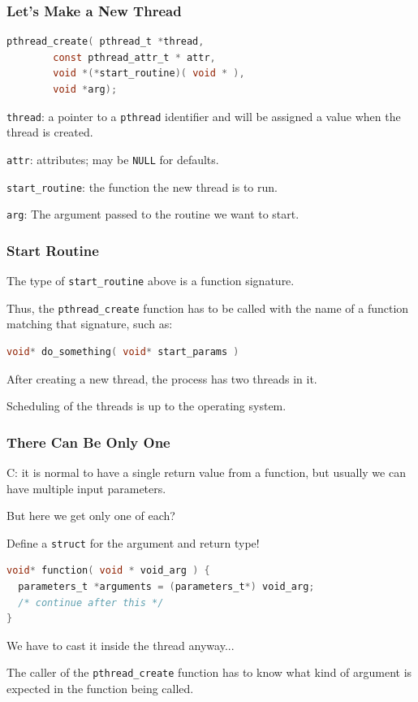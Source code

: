 \begin{frame}[fragile]
	\frametitle{Let's Make a New Thread}

	\begin{lstlisting}[language=C]
pthread_create( pthread_t *thread, 
		const pthread_attr_t * attr, 
		void *(*start_routine)( void * ), 
		void *arg);
\end{lstlisting}

	\texttt{thread}: a pointer to a \texttt{pthread} identifier and will be assigned a value when the thread is created.

	\texttt{attr}: attributes; may be \texttt{NULL} for defaults.

	\texttt{start\_routine}: the function the new thread is to run.

	\texttt{arg}: The argument passed to the routine we want to start.

\end{frame}


\begin{frame}[fragile]
	\frametitle{Start Routine}

	The type of \texttt{start\_routine} above is a function signature.

	Thus, the \texttt{pthread\_create} function has to be called with the name of a function matching that signature, such as:

	\begin{lstlisting}[language=C]
void* do_something( void* start_params )
\end{lstlisting}

	After creating a new thread, the process has two threads in it.

	Scheduling of the threads is up to the operating system.

\end{frame}


\begin{frame}[fragile]
	\frametitle{There Can Be Only One}

	C: it is normal to have a single return value from a function, but usually we can have multiple input parameters.

	But here we get only one of each?

	Define a \texttt{struct} for the argument and return type!

	\begin{lstlisting}[language=C]
void* function( void * void_arg ) {
  parameters_t *arguments = (parameters_t*) void_arg;
  /* continue after this */
}
\end{lstlisting}

	We have to cast it inside the thread anyway...

	The caller of the \texttt{pthread\_create} function has to know what kind of argument is expected in the function being called.

\end{frame}


